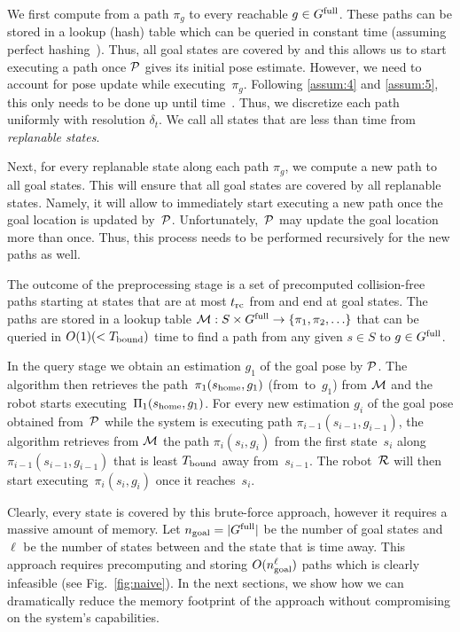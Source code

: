 \documentclass[conference]{IEEEtran}
\begin{document}
We first compute from \Shome a path $\pi_g$ to every reachable $g \in G^{\textrm{full}}$. 
These paths can be stored in a lookup (hash) table which can be queried in constant time (assuming perfect hashing~\cite{czech1997perfect}). Thus, all goal states are covered by \Shome and this allows us to start executing a path once $\mathcal{P}$ gives its initial pose estimate.
However, we need to account for pose update while executing~$\pi_g$. 
%
Following \ref{assum:4} and \ref{assum:5}, this only needs to be done up until time~\Trc.
Thus, we discretize each path uniformly with resolution $\delta_t$.
%
We call all states that are less than \Trc time from \Shome \emph{replanable states}.


Next, for every replanable state along each path $\pi_g$, we compute a new path to all goal states. 
%
This will ensure that all goal states are covered by all replanable states. Namely, it will allow to immediately start executing a new path once the goal location is updated by~$\mathcal{P}$.
%
Unfortunately,~$\mathcal{P}$ may update the goal location more than once. Thus, this process needs to be performed recursively for the new paths as well.


The outcome of the preprocessing stage is a set of precomputed collision-free paths starting at states that are at most $t_{\textrm{rc}}$ from \Shome and end at goal states.
The paths are stored in a lookup table $\mathcal{M}: S \times G^{\textrm{full}} \rightarrow \{ \pi_1, \pi_2, \ldots \}$ that can be queried in $O(1) (< T_{\textrm{bound}})$ time to find a path from any given $s \in S$ to $g \in G^{\textrm{full}}$.

In the query stage we obtain an estimation $g_1$ of the goal pose by $\mathcal{P}$. 
The algorithm then retrieves the path~$\pi_1(s_{\textrm{home}},g_1)$ (from~\Shome to~$g_1$) from $\mathcal{M}$ and the robot starts executing~$\Pi_1(s_{\textrm{home}},g_1)$.
%
For every new estimation $g_i$ of the goal pose obtained from~$\mathcal{P}$  while the system is executing path $\pi_{i-1}(s_{i-1},g_{i-1})$, the algorithm retrieves from $\mathcal{M}$ the path $\pi_i(s_i,g_i)$ from the first state~$s_i$ along $\pi_{i-1}(s_{i-1},g_{i-1})$ that is least $T_{\textrm{bound}}$ away from~$s_{i-1}$. The robot~$\mathcal{R}$ will then start executing~$\pi_i(s_i,g_i)$ once it reaches~$s_i$.

Clearly, every state is covered by this brute-force approach, however it requires a massive amount of memory.
Let $n_{\rm goal} = \vert G^{\textrm{full}} \vert$ be the number of goal states and
$\ell$ be the number of states between \Shome and the state that is \Trc time away.
This approach requires precomputing and storing $O(n_{\rm goal}^\ell)$ paths which is clearly infeasible (see Fig.~\ref{fig:naive}).
In the next sections, we show how we can dramatically reduce the memory footprint of the approach without compromising on the system's capabilities.
\end{document}
